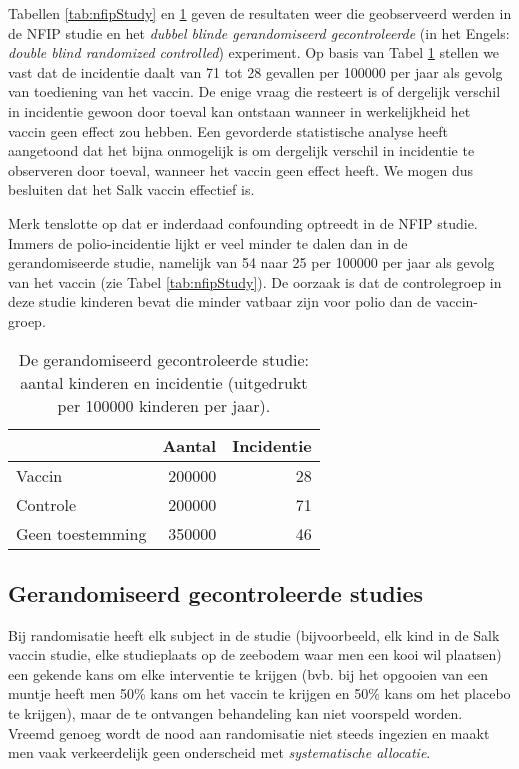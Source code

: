 \documentclass[12pt,dutch,coursenotes]{book}
\theoremstyle{definition}
\theoremstyle{definition}
\theoremstyle{definition}
\theoremstyle{remark}
\begin{document}
Tabellen \ref{tab:nfipStudy} en \ref{tab:dbrcStudy} geven de resultaten
weer die geobserveerd werden in de NFIP studie en het \emph{dubbel
blinde gerandomiseerd gecontroleerde} (in het Engels: \emph{double blind
randomized controlled}) experiment. Op basis van Tabel
\ref{tab:dbrcStudy} stellen we vast dat de incidentie daalt van 71 tot
28 gevallen per 100000 per jaar als gevolg van toediening van het
vaccin. De enige vraag die resteert is of dergelijk verschil in
incidentie gewoon door toeval kan ontstaan wanneer in werkelijkheid het
vaccin geen effect zou hebben. Een gevorderde statistische analyse heeft
aangetoond dat het bijna onmogelijk is om dergelijk verschil in
incidentie te observeren door toeval, wanneer het vaccin geen effect
heeft. We mogen dus besluiten dat het Salk vaccin effectief is.

Merk tenslotte op dat er inderdaad confounding optreedt in de NFIP
studie. Immers de polio-incidentie lijkt er veel minder te dalen dan in
de gerandomiseerde studie, namelijk van 54 naar 25 per 100000 per jaar
als gevolg van het vaccin (zie Tabel \ref{tab:nfipStudy}). De oorzaak is
dat de controlegroep in deze studie kinderen bevat die minder vatbaar
zijn voor polio dan de vaccin-groep.

\begin{table}

\caption{\label{tab:dbrcStudy}De gerandomiseerd gecontroleerde studie: aantal kinderen en incidentie (uitgedrukt per
100000 kinderen per jaar).}
\centering
\begin{tabular}[t]{lrr}
\toprule
  & Aantal & Incidentie\\
\midrule
Vaccin & 200000 & 28\\
Controle & 200000 & 71\\
Geen toestemming & 350000 & 46\\
\bottomrule
\end{tabular}
\end{table}

\subsection{Gerandomiseerd gecontroleerde
studies}\label{gerandomiseerd-gecontroleerde-studies}

Bij randomisatie heeft elk subject in de studie (bijvoorbeeld, elk kind
in de Salk vaccin studie, elke studieplaats op de zeebodem waar men een
kooi wil plaatsen) een gekende kans om elke interventie te krijgen (bvb.
bij het opgooien van een muntje heeft men 50\% kans om het vaccin te
krijgen en 50\% kans om het placebo te krijgen), maar de te ontvangen
behandeling kan niet voorspeld worden. Vreemd genoeg wordt de nood aan
randomisatie niet steeds ingezien en maakt men vaak verkeerdelijk geen
onderscheid met \emph{systematische allocatie}.
\end{document}
